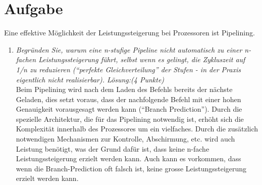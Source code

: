 \documentclass[10pt]{article}
\begin{document}
\section{Aufgabe}
Eine effektive Möglichkeit der Leistungssteigerung bei Prozessoren ist Pipelining.
\begin{enumerate}[label=\alph*)]
	\item 
	\textit{Begründen 	Sie, warum eine n-stufige Pipeline nicht automatisch zu einer n-fachen Leistungssteigerung führt, selbst wenn es gelingt, die Zykluszeit auf 1/n zu reduzieren ("`perfekte Gleichverteilung"' der Stufen - in der Praxis eigentlich nicht realisierbar). Lösung:(4 Punkte)} \\	
	Beim Pipelining wird nach dem Laden des Befehls bereits der nächste Geladen, dies setzt voraus, dass der nachfolgende Befehl mit einer hohen Genauigkeit vorausgesagt werden kann ("`Branch Prediction"'). Durch die spezielle Architektur, die für das Pipelining notwendig ist, erhöht sich die Komplexität innerhalb des Prozessores um ein vielfaches. Durch die zusätzlich notwendigen Mechanismen zur Kontrolle, Abschirmung, etc. wird auch Leistung benötigt, was der Grund dafür ist, dass keine n-fache Leistungssteigerung erzielt werden kann. Auch kann es vorkommen, dass wenn die Branch-Prediction oft falsch ist, keine grosse Leistungssteigerung erzielt werden kann.
\end{enumerate}
\newpage

\end{document}
